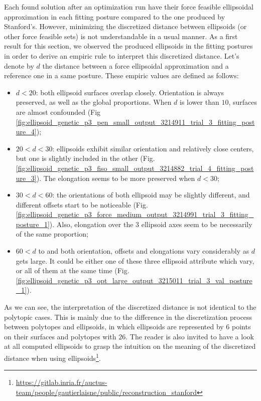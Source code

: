 Each found solution after an optimization run have their force feasible ellipsoidal approximation in each fitting posture compared to the one produced by Stanford's. However, minimizing the discretized distance between ellipsoids (or other force feasible sets) is not understandable in a usual manner. As a first result for this section, we observed the produced ellipsoids in the fitting postures in order to derive an empiric rule to interpret this discretized distance. Let's denote by $d$ the distance between a force ellipsoidal approximation and a reference one in a same posture. These empiric values are defined as follows:

\begin{itemize}[noitemsep]
    \item {$d < 20$: both ellipsoid surfaces overlap closely. Orientation is always preserved, as well as the global proportions. When $d$ is lower than $10$, surfaces are almost confounded (Fig \ref{fig:ellipsoid_genetic_p3_pen_small_output_3214911_trial_3_fitting_posture_4});}
    \item {$20 < d < 30$: ellipsoids exhibit similar orientation and relatively close centers, but one is slightly included in the other (Fig. \ref{fig:ellipsoid_genetic_p3_fiso_small_output_3214882_trial_4_fitting_posture_3}). The elongation seems to be more preserved when $d < 30$;}
    \item {$30 < d < 60$: the orientations of both ellipsoid may be slightly different, and different offsets start to be noticeable (Fig. \ref{fig:ellipsoid_genetic_p3_force_medium_output_3214991_trial_3_fitting_posture_1}). Also, elongation over the 3 ellipsoid axes seem to be necessarily of the same proportion;}
    \item {$60 < d$ to and both orientation, offsets and elongations vary considerably as $d$ gets large. It could be either one of these three ellipsoid attribute which vary, or all of them at the same time (Fig. \ref{fig:ellipsoid_genetic_p3_opt_large_output_3215011_trial_3_val_posture_1}).}
\end{itemize}

As we can see, the interpretation of the discretized distance is not identical to the polytopic cases. This is mainly due to the difference in the discretization process between polytopes and ellipsoids, in which ellipsoids are represented by $6$ points on their surfaces and polytopes with $26$. The reader is also invited to have a look at all computed ellipsoids to grasp the intuition on the meaning of the discretized distance when using ellipsoids\footnote{\url{https://gitlab.inria.fr/auctus-team/people/gautierlaisne/public/reconstruction_stanford}}.

